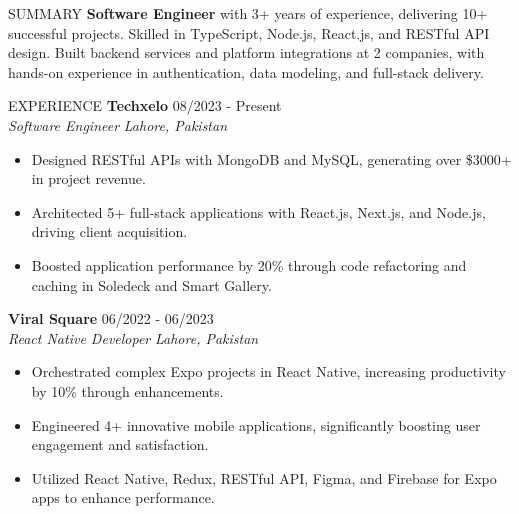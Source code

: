 \documentclass{resume}
\begin{document}
\begin{rSection}{SUMMARY}
\textbf{Software Engineer} with 3+ years of experience, delivering 10+ successful projects. Skilled in TypeScript, Node.js, React.js, and RESTful API design. Built backend services and platform integrations at 2 companies, with hands-on experience in authentication, data modeling, and full-stack delivery.
\end{rSection}
\begin{rSection}{EXPERIENCE}
\textbf{Techxelo} \hfill 08/2023 - Present \\
\textit{Software Engineer}  \hfill \textit{Lahore, Pakistan}
\begin{itemize}
\itemsep -3pt {}
\item Designed RESTful APIs with MongoDB and MySQL, generating over \$3000+ in project revenue.
\item Architected 5+ full-stack applications with React.js, Next.js, and Node.js, driving client acquisition.
\item Boosted application performance by 20\% through code refactoring and caching in Soledeck and Smart Gallery.
\end{itemize}
\textbf{Viral Square} \hfill 06/2022 - 06/2023 \\
\textit{React Native Developer} \hfill \textit{Lahore, Pakistan}
\begin{itemize}
\itemsep -3pt {}
\item Orchestrated complex Expo projects in React Native, increasing productivity by 10\% through enhancements.
\item Engineered 4+ innovative mobile applications, significantly boosting user engagement and satisfaction.
\item Utilized React Native, Redux, RESTful API, Figma, and Firebase for Expo apps to enhance performance.
\end{itemize}
\end{rSection}
\end{document}

